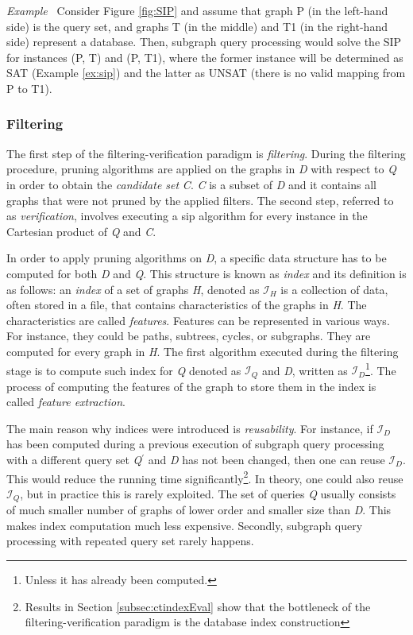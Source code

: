 \documentclass{l4proj}
\newcounter{example}[section]
\newenvironment{example}[1][]{\refstepcounter{example}\par\medskip
   \noindent \textit{Example~\theexample #1} \rmfamily}{\medskip}
\newcommand{\fancyI}{\mathcal{I}}
\begin{document}
\begin{example}
\label{ex:pathIndexing}
Consider Figure \ref{fig:SIP} and assume that graph P (in the left-hand side) is the query set, and graphs T (in the middle) and T1 (in the right-hand side) represent a database. Then, subgraph query processing would solve the SIP for instances (P, T) and (P, T1), where the former instance will be determined as SAT (Example \ref{ex:sip}) and the latter as UNSAT (there is no valid mapping from P to T1). 
\end{example}

\subsubsection{Filtering}

The first step of the filtering-verification paradigm is \emph{filtering}. During the filtering procedure, pruning algorithms are applied on the graphs in \emph{D} with respect to \emph{Q} in order to obtain the \emph{candidate set} \emph{C}. \emph{C} is a subset of \emph{D} and it contains all graphs that were not pruned by the applied filters. The second step, referred to as \emph{verification}, involves executing a \gls{sip} algorithm for every instance in the Cartesian product of \emph{Q} and \emph{C}.

In order to apply pruning algorithms on \emph{D}, a specific data structure has to be computed for both \emph{D} and \emph{Q}. This structure is known as \emph{index} and its definition is as follows: an \emph{index} of a set of graphs \emph{H}, denoted as $\fancyI_{H}$ is a collection of data, often stored in a file, that contains characteristics of the graphs in \emph{H}. The characteristics are called \emph{features}. Features can be represented in various ways. For instance, they could be paths, subtrees, cycles, or subgraphs. They are computed for every graph in \emph{H}. The first algorithm executed during the filtering stage is to compute such index for \emph{Q} denoted as $\fancyI_{Q}$ and \emph{D}, written as $\fancyI_{D}$\footnote{Unless it has already been computed.}. The process of computing the features of the graph to store them in the index is called \emph{feature extraction}.

The main reason why indices were introduced is \emph{reusability}. For instance, if $\fancyI_{D}$ has been computed during a previous execution of subgraph query processing with a different query set \emph{Q$^{\prime}$} and \emph{D} has not been changed, then one can reuse $\fancyI_{D}$. This would reduce the running time significantly\footnote{Results in Section \ref{subsec:ctindexEval} show that the bottleneck of the filtering-verification paradigm is the database index construction}. In theory, one could also reuse $\fancyI_{Q}$, but in practice this is rarely exploited. The set of queries \emph{Q} usually consists of much smaller number of graphs of lower order and smaller size than \emph{D}. This makes index computation much less expensive. Secondly, subgraph query processing with repeated query set rarely happens. 
\end{document}
